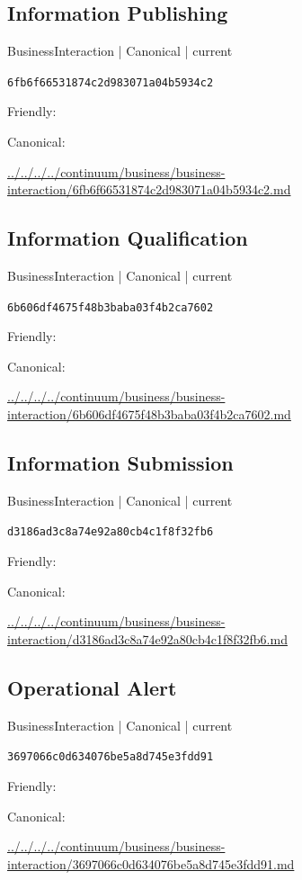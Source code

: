 \documentclass[10pt,a4paper]{article}
\begin{document}
\subsection*{Information Publishing}
{\small BusinessInteraction | Canonical | current}\par
\texttt{6fb6f66531874c2d983071a04b5934c2}\par
Friendly: \par
Canonical: \par
{\footnotesize\url{../../../../continuum/business/business-interaction/6fb6f66531874c2d983071a04b5934c2.md}}\par
\subsection*{Information Qualification}
{\small BusinessInteraction | Canonical | current}\par
\texttt{6b606df4675f48b3baba03f4b2ca7602}\par
Friendly: \par
Canonical: \par
{\footnotesize\url{../../../../continuum/business/business-interaction/6b606df4675f48b3baba03f4b2ca7602.md}}\par
\subsection*{Information Submission}
{\small BusinessInteraction | Canonical | current}\par
\texttt{d3186ad3c8a74e92a80cb4c1f8f32fb6}\par
Friendly: \par
Canonical: \par
{\footnotesize\url{../../../../continuum/business/business-interaction/d3186ad3c8a74e92a80cb4c1f8f32fb6.md}}\par
\subsection*{Operational Alert}
{\small BusinessInteraction | Canonical | current}\par
\texttt{3697066c0d634076be5a8d745e3fdd91}\par
Friendly: \par
Canonical: \par
{\footnotesize\url{../../../../continuum/business/business-interaction/3697066c0d634076be5a8d745e3fdd91.md}}\par
\end{document}
